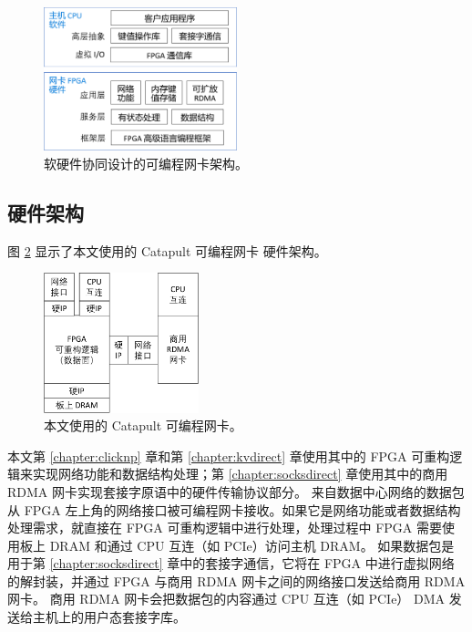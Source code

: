 \begin{figure}[htbp]
	\centering
	\includegraphics[width=0.5\textwidth]{figures/sw_hw_codesign.pdf}
	\caption{软硬件协同设计的可编程网卡架构。}
	\label{arch:fig:sw-hw-codesign}
\end{figure}


\subsection{硬件架构}


图 \ref{arch:fig:my-smartnic-current} 显示了本文使用的 Catapult 可编程网卡 \cite{putnam2014reconfigurable} 硬件架构。


\begin{figure}[htbp]
	\centering
	\includegraphics[width=0.4\textwidth]{figures/smartnic-current.pdf}
	\caption{本文使用的 Catapult 可编程网卡。}
	\label{arch:fig:my-smartnic-current}
\end{figure}




本文第 \ref{chapter:clicknp} 章和第 \ref{chapter:kvdirect} 章使用其中的 FPGA 可重构逻辑来实现网络功能和数据结构处理；第 \ref{chapter:socksdirect} 章使用其中的商用 RDMA 网卡实现套接字原语中的硬件传输协议部分。
来自数据中心网络的数据包从 FPGA 左上角的网络接口被可编程网卡接收。如果它是网络功能或者数据结构处理需求，就直接在 FPGA 可重构逻辑中进行处理，处理过程中 FPGA 需要使用板上 DRAM 和通过 CPU 互连（如 PCIe）访问主机 DRAM。
如果数据包是用于第 \ref{chapter:socksdirect} 章中的套接字通信，它将在 FPGA 中进行虚拟网络的解封装，并通过 FPGA 与商用 RDMA 网卡之间的网络接口发送给商用 RDMA 网卡。
商用 RDMA 网卡会把数据包的内容通过 CPU 互连（如 PCIe） DMA 发送给主机上的用户态套接字库。





